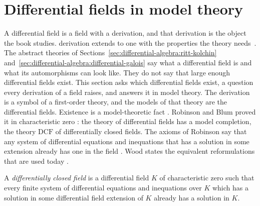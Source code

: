 \section{Differential fields in model theory}\label{sec:differential-algebra:model-theory}

A differential field is a field with a derivation, and that derivation is the
object the book studies. %
derivation extends to one with the properties the theory needs~\cite[pp.~129--134]{Wood1998DifferentiallyClosed}. The abstract
theories of
Sections~\ref{sec:differential-algebra:ritt-kolchin}
and~\ref{sec:differential-algebra:differential-galois} say what a
differential field is and what its automorphisms can look like. They do
not say that large enough differential fields exist. This section asks which
differential fields exist, a question every derivation of a field raises, and
answers it in model theory. The derivation is a
symbol of a first-order theory, and the models of that theory are the
differential fields. Existence is a
model-theoretic fact \cite[pp.~129--132]{Wood1998DifferentiallyClosed}.
Robinson and Blum proved it in
characteristic zero \cite[pp.~129--132]{Wood1998DifferentiallyClosed}:
the theory of differential fields has a model completion, the theory
$\mathrm{DCF}$ of differentially closed fields. The axioms of Robinson
say
that any system of differential equations and inequations that has a
solution in some extension already has one in the field
\cite[p.~131]{Wood1998DifferentiallyClosed}. Wood states the equivalent
reformulations that are used today
\cite[pp.~129--134]{Wood1998DifferentiallyClosed}.

\begin{definition}\label{def:diffalg:dcf}
A \emph{differentially closed field} is a differential field $K$ of
characteristic zero such that every finite system of differential
equations and inequations over $K$ which has a solution in some
differential field extension of $K$ already has a solution in $K$.
\end{definition}

